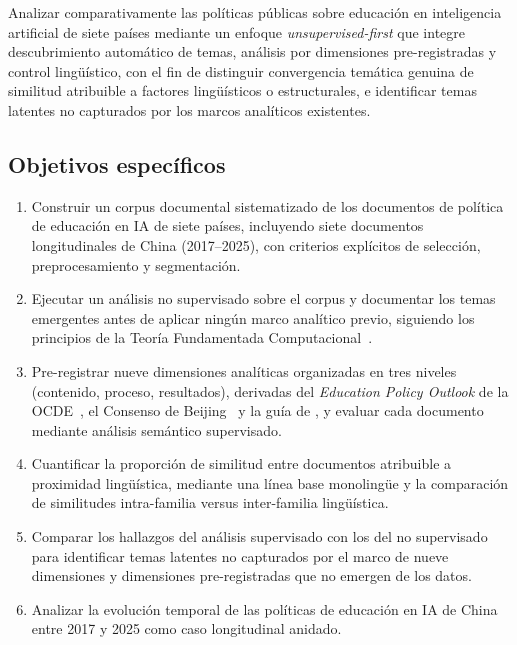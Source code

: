 Analizar comparativamente las políticas públicas sobre educación en inteligencia artificial de siete países mediante un enfoque \textit{unsupervised-first} que integre descubrimiento automático de temas, análisis por dimensiones pre-registradas y control lingüístico, con el fin de distinguir convergencia temática genuina de similitud atribuible a factores lingüísticos o estructurales, e identificar temas latentes no capturados por los marcos analíticos existentes.

\subsection{Objetivos específicos}
\label{subsec:objetivos-especificos}

\begin{enumerate}
  \item[\textbf{OE1.}] Construir un corpus documental sistematizado de los documentos de política de educación en IA de siete países, incluyendo siete documentos longitudinales de China (2017--2025), con criterios explícitos de selección, preprocesamiento y segmentación.

  \item[\textbf{OE2.}] Ejecutar un análisis no supervisado sobre el corpus y documentar los temas emergentes antes de aplicar ningún marco analítico previo, siguiendo los principios de la Teoría Fundamentada Computacional~\citep{nelson2020computational}.

  \item[\textbf{OE3.}] Pre-registrar nueve dimensiones analíticas organizadas en tres niveles (contenido, proceso, resultados), derivadas del \textit{Education Policy Outlook} de la OCDE~\citep{oecd2021epo}, el Consenso de Beijing~\citep{unesco2019beijing} y la guía de \citet{miao2021guidance}, y evaluar cada documento mediante análisis semántico supervisado.

  \item[\textbf{OE4.}] Cuantificar la proporción de similitud entre documentos atribuible a proximidad lingüística, mediante una línea base monolingüe y la comparación de similitudes intra-familia versus inter-familia lingüística.

  \item[\textbf{OE5.}] Comparar los hallazgos del análisis supervisado con los del no supervisado para identificar temas latentes no capturados por el marco de nueve dimensiones y dimensiones pre-registradas que no emergen de los datos.

  \item[\textbf{OE6.}] Analizar la evolución temporal de las políticas de educación en IA de China entre 2017 y 2025 como caso longitudinal anidado.
\end{enumerate}



